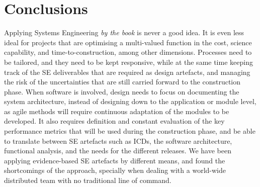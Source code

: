 \documentclass[11pt,twoside]{article}
\begin{document}


\section{Conclusions} %
\label{sec:conclusions}
Applying Systems Engineering \emph{by the book} is never a good idea. It is even less ideal for projects that are optimising a multi-valued function in the cost, science capability, and time-to-construction, among other dimensions. Processes need to be tailored, and they need to be kept responsive, while at the same time keeping track of the SE deliverables that are required as design artefacts, and managing the risk of the uncertainties that are still carried forward to the construction phase.
When software is involved, design needs to focus on documenting the system architecture, instead of designing down to the application or module level, as agile methods will require continuous adaptation of the modules to be developed. 
It also requires definition and constant evaluation of the key performance metrics that will be used during the construction phase, and be able to translate between SE artefacts such as ICDs, the software architecture, functional analysis, and the needs for the different releases.	
We have been applying evidence-based SE artefacts by different means, and found the shortcomings of the approach, specially when dealing with a world-wide distributed team with no traditional line of command.




\end{document}
